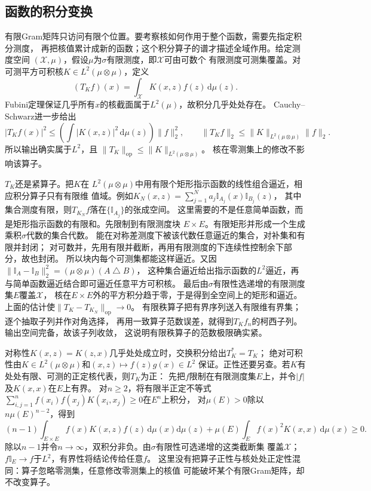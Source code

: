 \subsection{函数的积分变换}
\label{sec:functional-integral-transforms}
\label{sec:functional-kernel-spectrum-regularization}

有限Gram矩阵只访问有限个位置。要考察核如何作用于整个函数，需要先指定积分测度，
再把核值累计成新的函数；这个积分算子的谱才描述全域作用。给定测度空间
$(\mathcal X,\mu)$，假设$\mu$为$\sigma$有限测度，即$\mathcal X$可由可数个
有限测度可测集覆盖。对可测平方可积核$K\in L^2(\mu\otimes\mu)$，定义
\begin{equation}
 (T_Kf)(x)=\int_{\mathcal X}K(x,z)f(z)\,\mathrm d\mu(z).
 \label{eq:functional-kernel-integral-operator}
\end{equation}
Fubini定理保证几乎所有$x$的核截面属于$L^2(\mu)$，故积分几乎处处存在。
Cauchy--Schwarz进一步给出
\[
 |T_Kf(x)|^2
 \leq\left(\int|K(x,z)|^2\,\mathrm d\mu(z)\right)\lVert f\rVert_2^2,\qquad
 \lVert T_Kf\rVert_2\leq\lVert K\rVert_{L^2(\mu\otimes\mu)}\lVert f\rVert_2.
\]
所以输出确实属于$L^2$，且
$\lVert T_K\rVert_{\mathrm{op}}\leq\lVert K\rVert_{L^2(\mu\otimes\mu)}$。
核在零测集上的修改不影响该算子。

$T_K$还是紧算子。把$K$在
$L^2(\mu\otimes\mu)$中用有限个矩形指示函数的线性组合逼近，相应积分算子只有有限维
值域。例如$K_N(x,z)=\sum_{j=1}^N a_j\mathbb I_{A_j}(x)\mathbb I_{B_j}(z)$，
其中集合测度有限，则$T_{K_N}f$落在$\{\mathbb I_{A_j}\}$的张成空间。
这里需要的不是任意简单函数，而是矩形指示函数的有限和。先限制到有限测度块
$E\times E$。有限矩形并形成一个生成乘积$\sigma$代数的集合代数。
能在对称差测度下被该代数任意逼近的集合，对补集和有限并封闭；
对可数并，先用有限并截断，再用有限测度的下连续性控制余下部分，故也封闭。
所以块内每个可测集都能这样逼近。又因
$\lVert\mathbb I_A-\mathbb I_B\rVert_2^2=(\mu\otimes\mu)(A\mathbin\triangle B)$，
这种集合逼近给出指示函数的$L^2$逼近，再与简单函数逼近结合即可逼近任意平方可积核。
最后由$\sigma$有限性选递增的有限测度集$E$覆盖$\mathcal X$，
核在$E\times E$外的平方积分趋于零，于是得到全空间上的矩形和逼近。
上面的估计使$\lVert T_K-T_{K_N}\rVert_{\mathrm{op}}\to0$。
有限秩算子把有界序列送入有限维有界集；逐个抽取子列并作对角选择，
再用一致算子范数误差，就得到$T_Kf_n$的柯西子列。输出空间完备，故该子列收敛，
这说明有限秩算子的范数极限确实紧。

对称性$K(x,z)=K(z,x)$几乎处处成立时，交换积分给出$T_K^*=T_K$；
绝对可积性由$K\in L^2(\mu\otimes\mu)$和$(x,z)\mapsto f(z)g(x)\in L^2$
保证。正性还要另查。若$K$有处处有限、可测的正定核代表，则$T_K$为正：
先把$f$限制在有限测度集$E$上，并令$|f|$及$K(x,x)$在$E$上有界。
对$n\geq2$，将有限半正定不等式
$\sum_{i,j=1}^n f(x_i)f(x_j)K(x_i,x_j)\geq0$在$E^n$上积分，
对$\mu(E)>0$除以$n\mu(E)^{n-2}$，得到
\[
 (n-1)\int_{E\times E}f(x)K(x,z)f(z)\,\mathrm d\mu(x)\mathrm d\mu(z)
 +\mu(E)\int_E f(x)^2K(x,x)\,\mathrm d\mu(x)\geq0.
\]
除以$n-1$并令$n\to\infty$，双积分非负。由$\sigma$有限性可选递增的这类截断集
覆盖$\mathcal X$；$f\mathbb I_E\to f$于$L^2$，有界性将结论传给任意$f$。
这里没有把算子正性与核处处正定性混同：算子忽略零测集，任意修改零测集上的核值
可能破坏某个有限Gram矩阵，却不改变算子。

